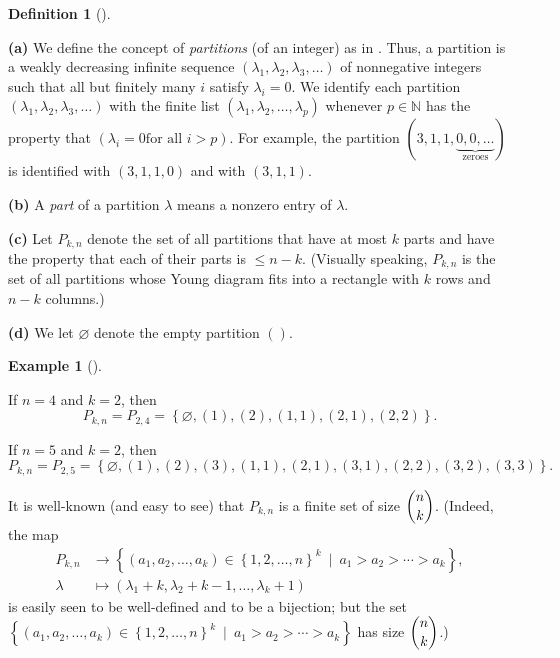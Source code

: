 \documentclass[numbers=enddot,12pt,final,onecolumn,notitlepage]{scrartcl}%
\theoremstyle{definition}
\newtheorem{defi}[theo]{Definition}
\newenvironment{definition}[1][]
{\begin{defi}[#1]\begin{leftbar}}
{\end{leftbar}\end{defi}}
\newtheorem{exmp}[theo]{Example}
\newenvironment{example}[1][]
{\begin{exmp}[#1]\begin{leftbar}}
{\end{leftbar}\end{exmp}}
\begin{document}
\begin{definition}
\label{def.partitions}\textbf{(a)} We define the concept of
\textit{partitions} (of an integer) as in \cite[Chapter 2]{GriRei18}. Thus, a
partition is a weakly decreasing infinite sequence $\left(  \lambda
_{1},\lambda_{2},\lambda_{3},\ldots\right)  $ of nonnegative integers such
that all but finitely many $i$ satisfy $\lambda_{i}=0$. We identify each
partition $\left(  \lambda_{1},\lambda_{2},\lambda_{3},\ldots\right)  $ with
the finite list $\left(  \lambda_{1},\lambda_{2},\ldots,\lambda_{p}\right)  $
whenever $p\in\mathbb{N}$ has the property that $\left(  \lambda_{i}=0\text{
for all }i>p\right)  $. For example, the partition $\left(
3,1,1,\underbrace{0,0,\ldots}_{\text{zeroes}}\right)  $ is identified with
$\left(  3,1,1,0\right)  $ and with $\left(  3,1,1\right)  $.

\textbf{(b)} A \textit{part} of a partition $\lambda$ means a nonzero entry of
$\lambda$.

\textbf{(c)} Let $P_{k,n}$ denote the set of all partitions that have at most
$k$ parts and have the property that each of their parts is $\leq n-k$.
(Visually speaking, $P_{k,n}$ is the set of all partitions whose Young diagram
fits into a rectangle with $k$ rows and $n-k$ columns.)

\textbf{(d)} We let $\varnothing$ denote the empty partition $\left(
{}\right)  $.
\end{definition}

\begin{example}
If $n=4$ and $k=2$, then%
\[
P_{k,n}=P_{2,4}=\left\{  \varnothing,\left(  1\right)  ,\left(  2\right)
,\left(  1,1\right)  ,\left(  2,1\right)  ,\left(  2,2\right)  \right\}  .
\]


If $n=5$ and $k=2$, then%
\[
P_{k,n}=P_{2,5}=\left\{  \varnothing,\left(  1\right)  ,\left(  2\right)
,\left(  3\right)  ,\left(  1,1\right)  ,\left(  2,1\right)  ,\left(
3,1\right)  ,\left(  2,2\right)  ,\left(  3,2\right)  ,\left(  3,3\right)
\right\}  .
\]

\end{example}

It is well-known (and easy to see) that $P_{k,n}$ is a finite set of size
$\dbinom{n}{k}$. (Indeed, the map%
\begin{align*}
P_{k,n}  &  \rightarrow\left\{  \left(  a_{1},a_{2},\ldots,a_{k}\right)
\in\left\{  1,2,\ldots,n\right\}  ^{k}\ \mid\ a_{1}>a_{2}>\cdots
>a_{k}\right\}  ,\\
\lambda &  \mapsto\left(  \lambda_{1}+k,\lambda_{2}+k-1,\ldots,\lambda
_{k}+1\right)
\end{align*}
is easily seen to be well-defined and to be a bijection; but the set
\newline$\left\{  \left(  a_{1},a_{2},\ldots,a_{k}\right)  \in\left\{
1,2,\ldots,n\right\}  ^{k}\ \mid\ a_{1}>a_{2}>\cdots>a_{k}\right\}  $ has size
$\dbinom{n}{k}$.)
\end{document}
